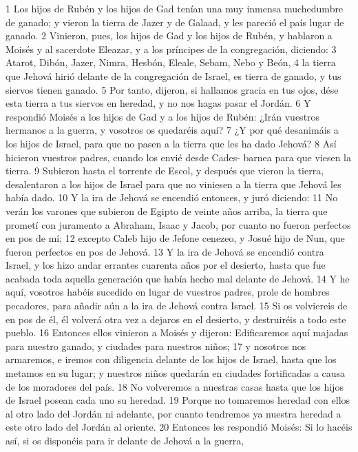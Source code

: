 1 Los hijos de Rubén y los hijos de Gad tenían una muy inmensa muchedumbre de ganado; y vieron la tierra de Jazer y de Galaad, y les pareció el país lugar de ganado.
2 Vinieron, pues, los hijos de Gad y los hijos de Rubén, y hablaron a Moisés y al sacerdote Eleazar, y a los príncipes de la congregación, diciendo:
3 Atarot, Dibón, Jazer, Nimra, Hesbón, Eleale, Sebam, Nebo y Beón,
4 la tierra que Jehová hirió delante de la congregación de Israel, es tierra de ganado, y tus siervos tienen ganado.
5 Por tanto, dijeron, si hallamos gracia en tus ojos, dése esta tierra a tus siervos en heredad, y no nos hagas pasar el Jordán.
6 Y respondió Moisés a los hijos de Gad y a los hijos de Rubén: ¿Irán vuestros hermanos a la guerra, y vosotros os quedaréis aquí?
7 ¿Y por qué desanimáis a los hijos de Israel, para que no pasen a la tierra que les ha dado Jehová?
8 Así hicieron vuestros padres, cuando los envié desde Cades- barnea para que viesen la tierra.
9 Subieron hasta el torrente de Escol, y después que vieron la tierra, desalentaron a los hijos de Israel para que no viniesen a la tierra que Jehová les había dado.
10 Y la ira de Jehová se encendió entonces, y juró diciendo:
11 No verán los varones que subieron de Egipto de veinte años arriba, la tierra que prometí con juramento a Abraham, Isaac y Jacob, por cuanto no fueron perfectos en pos de mí;
12 excepto Caleb hijo de Jefone cenezeo, y Josué hijo de Nun, que fueron perfectos en pos de Jehová.
13 Y la ira de Jehová se encendió contra Israel, y los hizo andar errantes cuarenta años por el desierto, hasta que fue acabada toda aquella generación que había hecho mal delante de Jehová. 
14 Y he aquí, vosotros habéis sucedido en lugar de vuestros padres, prole de hombres pecadores, para añadir aún a la ira de Jehová contra Israel.
15 Si os volviereis de en pos de él, él volverá otra vez a dejaros en el desierto, y destruiréis a todo este pueblo.
16 Entonces ellos vinieron a Moisés y dijeron: Edificaremos aquí majadas para nuestro ganado, y ciudades para nuestros niños;
17 y nosotros nos armaremos, e iremos con diligencia delante de los hijos de Israel, hasta que los metamos en su lugar; y nuestros niños quedarán en ciudades fortificadas a causa de los moradores del país.
18 No volveremos a nuestras casas hasta que los hijos de Israel posean cada uno su heredad.
19 Porque no tomaremos heredad con ellos al otro lado del Jordán ni adelante, por cuanto tendremos ya nuestra heredad a este otro lado del Jordán al oriente.
20 Entonces les respondió Moisés: Si lo hacéis así, si os disponéis para ir delante de Jehová a la guerra,
